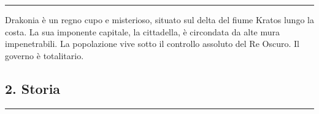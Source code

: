 \begin{center}\rule{0.5\linewidth}{0.5pt}\end{center}

Drakonia è un regno cupo e misterioso, situato sul delta del fiume
Kratos lungo la costa. La sua imponente capitale, la cittadella, è
circondata da alte mura impenetrabili. La popolazione vive sotto il
controllo assoluto del Re Oscuro. Il governo è totalitario.

\subsection{2. Storia}\label{storia}

\begin{center}\rule{0.5\linewidth}{0.5pt}\end{center}

